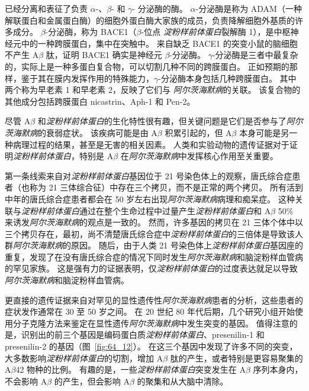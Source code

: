 已经分离和表征了负责 $\alpha$-、$\beta$- 和 $\gamma$- 分泌酶的酶。
$\alpha$-分泌酶是称为 ADAM（一种解联蛋白和金属蛋白酶）的细胞外蛋白酶大家族的成员，负责降解细胞外基质的许多成分。
$\beta$-分泌酶，称为 BACE1（$\beta$-位点 \textit{淀粉样前体蛋白}裂解酶 1），是中枢神经元中的一种跨膜蛋白，集中在突触中。
来自缺乏 BACE1 的突变小鼠的脑细胞不产生 A$\beta$ 肽，证明 BACE1 确实是神经元 $\beta$-分泌酶。
$\gamma$-分泌酶是三者中最复杂的，实际上是一种多蛋白复合物，可以切割几种不同的跨膜蛋白。
正如预期的那样，鉴于其在膜内发挥作用的特殊能力，$\gamma$-分泌酶本身包括几种跨膜蛋白。
其中两个称为早老素 1 和早老素 2，反映了它们与 \textit{阿尔茨海默病}的关联。
该复合物的其他成分包括跨膜蛋白 nicastrin、Aph-1 和 Pen-2。


尽管 A$\beta$ 和\textit{淀粉样前体蛋白}的生化特性很有趣，但关键问题是它们是否参与了\textit{阿尔茨海默病}的衰弱症状。
该疾病可能是由 A$\beta$ 积累引起的，但 A$\beta$ 本身可能是另一种病理过程的结果，甚至是无害的相关因素。
人类和实验动物的遗传证据对于证明\textit{淀粉样前体蛋白}，特别是 A$\beta$ 在\textit{阿尔茨海默病}中发挥核心作用至关重要。


第一条线索来自对\textit{淀粉样前体蛋白}基因位于 21 号染色体上的观察，唐氏综合症患者（也称为 21 三体综合征）中存在三个拷贝，而不是正常的两个拷贝。
所有活到中年的唐氏综合症患者都会在 50 岁左右出现\textit{阿尔茨海默病}病理和痴呆症。
这种关联与\textit{淀粉样前体蛋白}通过在整个生命过程中过量产生\textit{淀粉样前体蛋白}和 A$\beta$ 50\% 来诱发\textit{阿尔茨海默病}的观点是一致的。
然而，许多基因的拷贝在 21 三体个体中以三个拷贝存在，最初，尚不清楚唐氏综合症中\textit{淀粉样前体蛋白}的三倍体是导致该人群\textit{阿尔茨海默病}的原因。
随后，由于人类 21 号染色体上\textit{淀粉样前体蛋白}基因座的重复，发现了在没有唐氏综合症的情况下同时发生\textit{阿尔茨海默病}和脑淀粉样血管病的罕见家族。
这是强有力的证据表明，仅\textit{淀粉样前体蛋白}的过度表达就足以导致\textit{阿尔茨海默病}和脑淀粉样血管病。


更直接的遗传证据来自对罕见的显性遗传性\textit{阿尔茨海默病}患者的分析，这些患者的症状发作通常在 30 至 50 岁之间。
在 20 世纪 80 年代后期，几个研究小组开始使用分子克隆方法来鉴定在显性遗传\textit{阿尔茨海默病}中发生突变的基因。
值得注意的是，识别出的前三个基因是编码蛋白质\textit{淀粉样前体蛋白}、presenilin-1 和 presenilin-2 的基因（图~\ref{fig:64_12}）。
在这三个基因中发现了许多不同的突变，大多数影响\textit{淀粉样前体蛋白}的切割，增加 A$\beta$ 肽的产生，或者特别是更容易聚集的 A$\beta$42 物种的比例。
有趣的是，一些\textit{淀粉样前体蛋白}突变发生在 A$\beta$ 序列本身内，不会影响 A$\beta$ 的产生，但会影响 A$\beta$ 的聚集和从大脑中清除。


